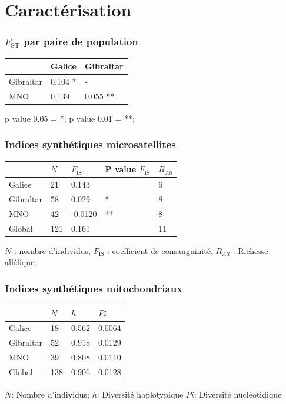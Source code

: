 \documentclass[10pt,xcolor=table]{beamer}\usepackage[]{graphicx}\usepackage[]{color}
\begin{document}
\section{Caractérisation}

\begin{frame}
	\frametitle{$F_\textrm{ST}$ par paire de population}
\begin{table}[htpb]
\begin{center}
\centering
\begin{tabular}{lll}
  \hline
   &   Galice   &    Gibraltar    \\
  \hline
Gibraltar   &   0.104 * 	& - \\
MNO   &   0.139 & 0.055 ** \\
  \hline
\end{tabular}
\end{center}
\end{table}
\centering p value 0.05 = *; p value 0.01 = **; 
\end{frame}

\begin{frame}
	\frametitle{Indices synthétiques microsatellites}
	
\begin{table}[htpb]
\centering
\begin{tabular}{lllll}
\hline
 & $N$ & $F_\textrm{IS}$ & P value $F_\textrm{IS}$  & $R_{All}$ \\
\hline
Galice 			&	21	&	0.143	& 	 &	6 	\\
Gibraltar 		&	58	&	0.029	& *  &	8	\\
MNO 			&	42	&	-0.0120	& ** &	8	 \\
\hline
Global 			&	121	&	0.161	&    &	11 	\\
\hline
\end{tabular}
\end{table}
\centering $N$ : nombre d'individus, $F_\textrm{IS}$ : coefficient de consanguinité, $R_{All}$ : Richesse allélique.
\end{frame}

\begin{frame}
	\frametitle{Indices synthétiques mitochondriaux}
\begin{table}[!]
\centering
\begin{tabular}{llll}
\hline
 & $N$	&	$h$	&	$Pi$	\\
\hline
Galice &	18	&	0.562	&	0.0064 \\
Gibraltar &	52	&	0.918	&	0.0129 	\\
MNO &	39	&	0.808	&	0.0110	 \\
\hline
Global &	138	&	0.906	&	0.0128	\\
\hline
\end{tabular}
\end{table}	
\centering $N$: Nombre d'individus; $h$: Diversité haplotypique $Pi$: Diversité nucléotidique
\end{frame}
\end{document}
